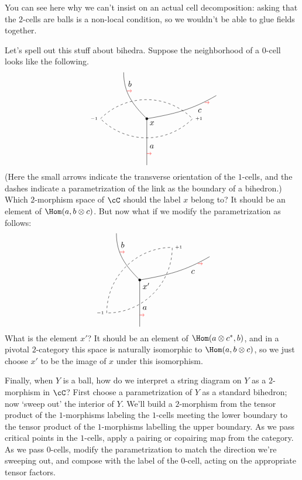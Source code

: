 \documentclass[11pt]{amsart}
\theoremstyle{plain}
\newcommand{\tensor}{\otimes}
\begin{document}
You can see here why we can't insist on an actual cell decomposition: asking that the $2$-cells are balls is a non-local condition, so we wouldn't be able to glue fields together.

Let's spell out this stuff about bihedra. Suppose the neighborhood of a $0$-cell looks like the following.
$$
\begin{tikzpicture}
\draw[fill] (0,0) circle (0.5mm) node[anchor=north west] (x) {$x$};
\draw (0,0) to[out=135,in=-90] node[above=10] {$b$} (-1,2);
\draw (0,0) to[out=10,in=-150] node[right=15] {$c$} (3,1);
\draw (0,0) -- node[below right] {$a$} (0,-2);
\draw[red,->] (0,-1.5) -- +(0.2,0);
\draw[red,->] (-0.85,1.2) -- +(0.2,0);
\draw[red,->] (2.5,0.7) -- +(0.2,0);
\draw[dashed] (-2,0) arc (135:45:2.81) node[anchor=west] {\tiny $+1$} arc (-45:-135:2.81) node[anchor=east] {\tiny $-1$};
\end{tikzpicture}
$$
(Here the small arrows indicate the transverse orientation of the $1$-cells, and the dashes indicate a parametrization of the link as the boundary of a bihedron.)
Which $2$-morphism space of $\cC$ should the label $x$ belong to? It should be an element of $\Hom(a, b \tensor c)$. But now what if we modify the parametrization as follows:
$$
\begin{tikzpicture}
\draw[fill] (0,0) circle (0.5mm) node[anchor=north west] (x) {$x'$};
\draw (0,0) to[out=135,in=-90] node[above=10] {$b$} (-1,2);
\draw (0,0) to[out=10,in=-150] node[right=15] {$c$} (3,1);
\draw (0,0) -- node[below right] {$a$} (0,-2);
\draw[red,->] (0,-1.5) -- +(0.2,0);
\draw[red,->] (-0.85,1.2) -- +(0.2,0);
\draw[red,->] (2.5,0.7) -- +(0.2,0);
\draw[dashed] (225:2) arc (180:90:2.81) node[anchor=west] {\tiny $+1$} arc (0:-90:2.81) node[anchor=east] {\tiny $-1$};
\end{tikzpicture}
$$
What is the element $x'$? It should be an element of $\Hom(a \tensor c^*, b)$, and in a pivotal $2$-category this space is naturally isomorphic to $\Hom(a, b \tensor c)$, so we just choose $x'$ to be the image of $x$ under this isomorphism.

Finally, when $Y$ is a ball, how do we interpret a string diagram on $Y$ as a $2$-morphism in $\cC$? First choose a parametrization of $Y$ as a standard bihedron; now `sweep out' the interior of $Y$. We'll build a $2$-morphism from the tensor product of the $1$-morphisms labeling the $1$-cells meeting the lower boundary to the tensor product of the $1$-morphisms labelling the upper boundary. As we pass critical points in the $1$-cells, apply a pairing or copairing map from the category. As we pass $0$-cells, modify the parametrization to match the direction we're sweeping out, and compose with the label of the $0$-cell, acting on the appropriate tensor factors.
\end{document}
